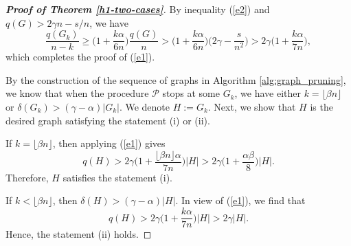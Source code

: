 \documentclass[11pt,a4paper]{article}
\theoremstyle{plain}
\theoremstyle{definition}
\begin{document}
\begin{proof}[{\bf Proof of Theorem \ref{h1-two-cases}}]
 
 By inequality (\ref{e2}) and $q(G)> 2\gamma n - s/n$, we have
 $$\frac{q(G_{k})}{n-k}\geq   \bigg(1+\frac{k\alpha}{6n}\bigg) \frac{q(G)}{n} >  
 \bigg(1+\frac{k\alpha}{6n}\bigg)\bigg(2\gamma-\frac{s}{n^{2}}\bigg)
 >2\gamma\bigg(1+\frac{k\alpha}{7n}\bigg),$$
which completes the proof of (\ref{e1}).

By the construction of the sequence of graphs in Algorithm \ref{alg:graph_pruning}, 
we know that when the procedure $\mathcal{P}$ stops at some $G_k$, 
we have either $k=\lfloor\beta n\rfloor$ 
or $\delta(G_k)> (\gamma-\alpha)|G_k|$. We denote $H:=G_k$. 
Next, we show that $H$ is the desired graph satisfying the 
statement (i) or (ii). 

If $k=\lfloor\beta n\rfloor$, then applying (\ref{e1}) gives 
$$q(H)>2\gamma\bigg(1+\frac{\lfloor\beta n\rfloor\alpha}{7n}\bigg)|H|>2\gamma\bigg(1+\frac{\alpha\beta}{8}\bigg)|H|.$$
Therefore, $H$ satisfies the statement (i).

If $k<\lfloor\beta n\rfloor$, then $\delta(H)> (\gamma-\alpha)|H|$. In view of (\ref{e1}), we find that
$$q(H)>2\gamma\bigg(1+\frac{k\alpha}{7n}\bigg)|H|>2\gamma |H|.$$
Hence, the statement (ii) holds.
\end{proof}
\end{document}
